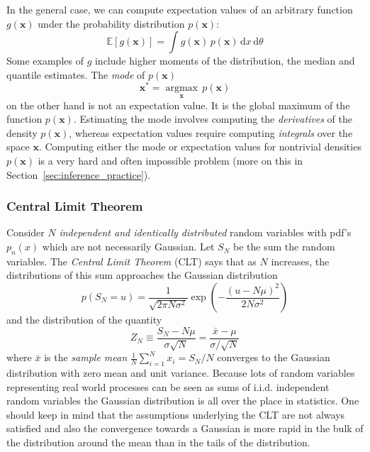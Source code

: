 \documentclass[12pt]{report}
\newcommand{\ud}{\,\mathrm{d}}
\renewcommand{\vec}[1]{\boldsymbol{\mathbf{#1}}}
\begin{document}
In the general case, we can compute expectation values of an arbitrary function
$g(\vec{x})$ under the probability distribution $p(\vec{x})$:
\begin{equation}
    \mathbb{E}\left[g(\vec{x})\right]=\int g(\vec{x})\,p(\vec{x})\ud x
    \ud\theta
\end{equation}
Some examples of $g$ include higher moments of the distribution, the median and
quantile estimates. The \emph{mode} of $p(\vec{x})$
\begin{equation}
    \vec{x}^{*}=\underset{\vec{x}}{\operatorname{argmax}}\,p(\vec{x})
\end{equation}
on the other hand is not an expectation value. It is the global maximum of the
function $p(\vec{x})$.
Estimating the mode involves computing the \emph{derivatives} of the density
$p(\vec{x})$, whereas expectation values require computing
\emph{integrals} over the space $\vec{x}$. Computing either
the mode or expectation values
for nontrivial densities $p(\vec{x})$ is a very hard and often impossible problem
(more on this in Section~\ref{sec:inference_practice}).

\subsubsection{Central Limit Theorem}
Consider $N$ \emph{independent and identically distributed} random variables
with pdf's $p_n(x)$ which are not necessarily Gaussian. Let $S_N$ be the sum
the random variables. The \emph{Central Limit Theorem} (CLT) says that as $N$
increases, the distributions of this sum approaches the Gaussian distribution
\begin{equation}
    p\left(S_{N}=u\right)=\frac{1}{\sqrt{2 \pi N \sigma^{2}}} \exp \left(-\frac{(u-N \mu)^{2}}{2 N \sigma^{2}}\right)
\end{equation}
and the distribution of the quantity
\begin{equation}
    Z_{N} \equiv \frac{S_{N}-N \mu}{\sigma \sqrt{N}}=\frac{\bar{x}-\mu}{\sigma / \sqrt{N}}
\end{equation}
where $\bar{x}$ is the \emph{sample mean} $\frac{1}{N}\sum_{i=1}^Nx_i=S_N/N$
converges to the Gaussian distribution with zero mean and unit variance.
Because lots of random variables representing real world processes can be seen as sums
of i.i.d. independent random variables the Gaussian distribution is all over the place
in statistics. One should keep in mind that the assumptions underlying the CLT are
not always satisfied and also the convergence towards a Gaussian is
more rapid in the bulk of the distribution around the mean than in the tails of the
distribution.
\end{document}
